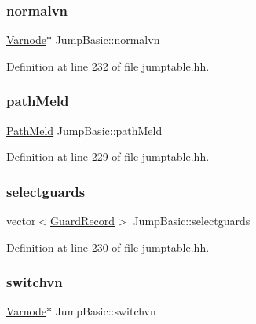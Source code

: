 \subsubsection{\texorpdfstring{normalvn}{normalvn}}
{\footnotesize\ttfamily \mbox{\hyperlink{class_varnode}{Varnode}}$\ast$ Jump\+Basic\+::normalvn\hspace{0.3cm}{\ttfamily [protected]}}



Definition at line 232 of file jumptable.\+hh.

\mbox{\label{class_jump_basic_aade10e6498d3f6146674b7b9ae1938e5}} 
\subsubsection{\texorpdfstring{pathMeld}{pathMeld}}
{\footnotesize\ttfamily \mbox{\hyperlink{class_path_meld}{Path\+Meld}} Jump\+Basic\+::path\+Meld\hspace{0.3cm}{\ttfamily [protected]}}



Definition at line 229 of file jumptable.\+hh.

\mbox{\label{class_jump_basic_a226ae48889e18ba9998b42105d991d35}} 
\subsubsection{\texorpdfstring{selectguards}{selectguards}}
{\footnotesize\ttfamily vector$<$\mbox{\hyperlink{class_guard_record}{Guard\+Record}}$>$ Jump\+Basic\+::selectguards\hspace{0.3cm}{\ttfamily [protected]}}



Definition at line 230 of file jumptable.\+hh.

\mbox{\label{class_jump_basic_a3eba94be92b13b5a0a0fbc85bdb26146}} 
\subsubsection{\texorpdfstring{switchvn}{switchvn}}
{\footnotesize\ttfamily \mbox{\hyperlink{class_varnode}{Varnode}}$\ast$ Jump\+Basic\+::switchvn\hspace{0.3cm}{\ttfamily [protected]}}



